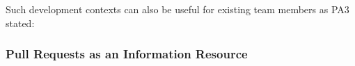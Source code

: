 

Such development contexts can also be useful for existing team members as PA3 stated:




\subsubsection{Pull Requests as an Information Resource}


